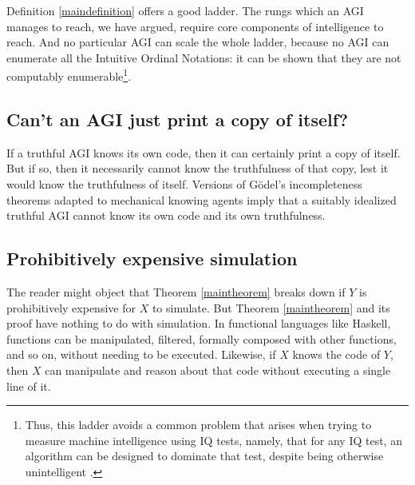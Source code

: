 \documentclass[runningheads]{llncs}
\begin{document}
Definition \ref{maindefinition} offers a good ladder.
The rungs which an AGI
manages to reach, we have argued, require core components of intelligence
to reach.
And no particular AGI can scale
the whole ladder,
because no AGI can enumerate all the Intuitive Ordinal Notations: it can
be shown
that they are not computably enumerable\footnote{Thus,
this ladder avoids a common problem that arises when
trying to measure machine intelligence using IQ tests, namely, that for any IQ test,
an algorithm can be designed to dominate that
test, despite being otherwise unintelligent \cite{besold2015can}.}.


\subsection{Can't an AGI just print a copy of itself?}


If a truthful AGI knows its own code,
then it can certainly print a copy of itself.
But if so, then it necessarily cannot know the truthfulness of that
copy, lest it would know the truthfulness of itself.
Versions of G\"odel's incompleteness theorems adapted \cite{reinhardt1985absolute} to
mechanical knowing agents imply that a suitably idealized truthful AGI cannot know
its own code
and its own truthfulness.

\subsection{Prohibitively expensive simulation}

The reader might object that Theorem \ref{maintheorem} breaks down if $Y$ is prohibitively
expensive for $X$ to simulate. But Theorem \ref{maintheorem} and its
proof have nothing to do with simulation. In functional languages like
Haskell, functions can be manipulated, filtered,
formally composed with other functions, and so on, without needing
to be executed.
Likewise, if $X$ knows the code
of $Y$, then $X$ can manipulate and reason about that code without executing a single line
of it.

\end{document}
